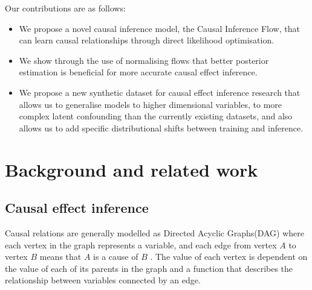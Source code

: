 \documentclass{report}
\begin{document}
\noindent
Our contributions are as follows:
\begin{itemize}
    \item We propose a novel causal inference model, the Causal Inference Flow, that can learn causal relationships through direct likelihood optimisation.
    \item We show through the use of normalising flows that better posterior estimation is beneficial for more accurate causal effect inference.
    \item We propose a new synthetic dataset for causal effect inference research that allows us to generalise models to higher dimensional variables, to more complex latent confounding than the currently existing datasets, and also allows us to add specific distributional shifts between training and inference.
\end{itemize}



\chapter{Background and related work}
\section{Causal effect inference}





Causal relations are generally modelled as Directed Acyclic Graphs(DAG) where each vertex in the graph represents a variable, and each edge from vertex $A$ to vertex $B$ means that $A$ is a cause of $B$ \parencite{pearl2009causal}. The value of each vertex is dependent on the value of each of its parents in the graph and a function that describes the relationship between variables connected by an edge.
\end{document}
